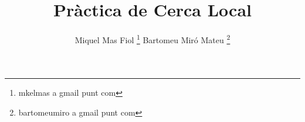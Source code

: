 \documentclass[a4paper,11pt]{scrartcl}
\title{Pràctica de Cerca Local}
\author{ Miquel Mas Fiol \thanks{mkelmas a gmail punt com}
	 Bartomeu Miró Mateu \thanks{bartomeumiro a gmail punt com} \\}
\begin{document}
  \maketitle

  \begin{abstract}
    
  \end{abstract}

  \newpage
  \setcounter{page}{2}
  \tableofcontents
  \newpage

  
  
  
  
  
\end{document}
